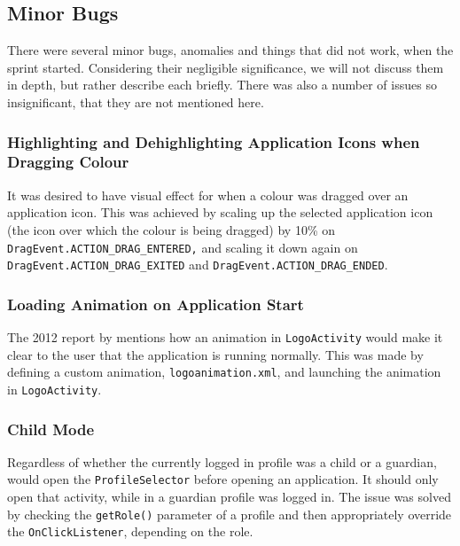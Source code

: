 \subsection{Minor Bugs}

There were several minor bugs, anomalies and things that did not work, when the sprint started.
Considering their negligible significance, we will not discuss them in depth, but rather describe each briefly.
There was also a number of issues so insignificant, that they are not mentioned here.

\subsubsection{Highlighting and Dehighlighting Application Icons when Dragging Colour}
It was desired to have visual effect for when a colour was dragged over an application icon.
This was achieved by scaling up the selected application icon (the icon over which the colour is being dragged) by 10\% on \lstinline{DragEvent.ACTION_DRAG_ENTERED,} and scaling it down again on \lstinline{DragEvent.ACTION_DRAG_EXITED} and \lstinline{DragEvent.ACTION_DRAG_ENDED}.

\subsubsection{Loading Animation on Application Start}
The 2012 report by \citet{launcher2012} mentions how an animation in \lstinline{LogoActivity} would make it clear to the user that the application is running normally.
This was made by defining a custom animation, \lstinline{logoanimation.xml}, and launching the animation in \lstinline{LogoActivity}.

\subsubsection{Child Mode}
Regardless of whether the currently logged in profile was a child or a guardian, \launcher would open the \lstinline{ProfileSelector} before opening an application.
It should only open that activity, while in a guardian profile was logged in.
The issue was solved by checking the \lstinline{getRole()} parameter of a profile and then appropriately override the \lstinline{OnClickListener}, depending on the role. 

